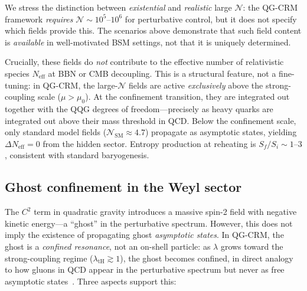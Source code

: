\documentclass[aps,prd,twocolumn,superscriptaddress,nofootinbib]{revtex4-2}
\begin{document}
We stress the distinction between \textit{existential} and \textit{realistic} large $\mathcal{N}$: the QG-CRM framework \textit{requires} $\mathcal{N} \sim 10^5$--$10^6$ for perturbative control, but it does not specify which fields provide this. The scenarios above demonstrate that such field content is \textit{available} in well-motivated BSM settings, not that it is uniquely determined.

Crucially, these fields do \textit{not} contribute to the effective number of relativistic species $N_\mathrm{eff}$ at BBN or CMB decoupling. This is a structural feature, not a fine-tuning: in QG-CRM, the large-$\mathcal{N}$ fields are active \textit{exclusively} above the strong-coupling scale ($\mu > \mu_0$). At the confinement transition, they are integrated out together with the QQG degrees of freedom---precisely as heavy quarks are integrated out above their mass threshold in QCD. Below the confinement scale, only standard model fields ($\mathcal{N}_\mathrm{SM} \approx 4.7$) propagate as asymptotic states, yielding $\Delta N_\mathrm{eff} = 0$ from the hidden sector. Entropy production at reheating is $S_f/S_i \sim 1$--$3$, consistent with standard baryogenesis.

\subsection{Ghost confinement in the Weyl sector}
\label{sec:ghost}

The $C^2$ term in quadratic gravity introduces a massive spin-2 field with negative kinetic energy---a ``ghost'' in the perturbative spectrum. However, this does not imply the existence of propagating ghost \textit{asymptotic states}. In QG-CRM, the ghost is a \textit{confined resonance}, not an on-shell particle: as $\lambda$ grows toward the strong-coupling regime ($\lambda_\mathrm{tH} \gtrsim 1$), the ghost becomes confined, in direct analogy to how gluons in QCD appear in the perturbative spectrum but never as free asymptotic states~\cite{HoldomRen2016}. Three aspects support this:
\end{document}
